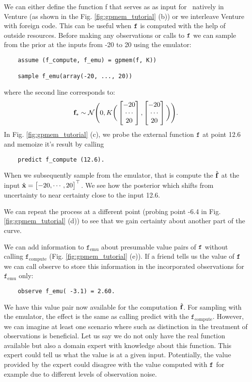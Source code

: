 We can either define the function f that serves as as input for \gpmem\
 natively in Venture
(as shown in the Fig. \ref{fig:gpmem_tutorial} (b)) or we interleave Venture with foreign code. 
This can be useful when $\texttt{f}$ is computed with the help of outside resources.
Before making any observations or calls to $\texttt{f}$
we can sample from the prior at the inputs from -20 to 20 using the emulator:
    \begin{lstlisting}
    assume (f_compute, f_emu) = gpmem(f, K))

    sample f_emu(array(-20, ..., 20))
    \end{lstlisting}
where the second line corresponds to:
\[ 
\mathbf{f}_* \sim \mathcal{N}\Bigg(0,K\bigg(
\begin{bmatrix} 
-20 \\
\cdots \\
20
 \end{bmatrix},
\begin{bmatrix} 
-20 \\
\cdots \\
20
 \end{bmatrix}
\bigg)
\Bigg).
\]
In Fig. \ref{fig:gpmem_tutorial} (c), we probe the external function $\texttt{f}$ at point 12.6 and memoize it's result by calling 
   \begin{lstlisting}
    predict f_compute (12.6).
    \end{lstlisting}
When we subsequently sample from the emulator, that is compute the $\hat{\mathbf{f}}$ at the input
$\hat{\mathbf{x}}= \begin{bmatrix} -20, \cdots, 20 \end{bmatrix}^\top$. We see how the posterior which shifts from uncertainty to near certainty close to the input 12.6.

We can repeat the process at a different point (probing point -6.4 in Fig.
\ref{fig:gpmem_tutorial} (d)) to see that we gain certainty about another part of the curve. 

We can add information to $\texttt{f}_\text{emu}$ about presumable value pairs of $\texttt{f}$ without calling $\texttt{f}_\text{compute}$
(Fig. \ref{fig:gpmem_tutorial} (e)).
If a friend tells us the value of $\texttt{f}$ we can call observe to store this information in the incorporated observations for $\texttt{f}_\text{emu}$ only:
    \begin{lstlisting}
    observe f_emu( -3.1) = 2.60.
    \end{lstlisting}
We have this value pair now available for the computation $\hat{\mathbf{f}}$. 
For sampling with the emulator, the effect is the same as calling predict with the $\texttt{f}_\text{compute}$.
However, we can imagine at least one scenario where such as distinction in the treatment of observations 
is beneficial. Let us say we do not only have the real function available but also a domain expert with knowledge 
about this function.
This expert could tell us what the value is at a given input.
Potentially, the value provided by the expert could disagree with the value computed with $\texttt{f}$ for example 
due to different levels of observation noise. 

